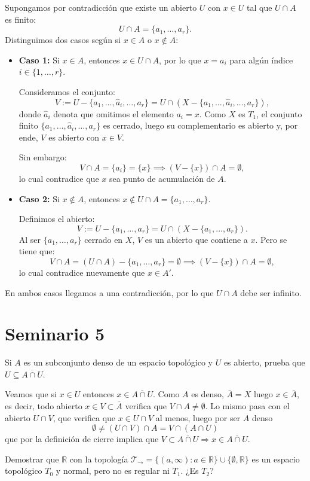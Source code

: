 \begin{sol}
Supongamos por contradicción que existe un abierto $U$ con $x \in U$ tal que $U \cap A$ es finito:
\[
    U \cap A = \{a_1, \ldots, a_r\}.
\]
Distinguimos dos casos según si $x \in A$ o $x \notin A$:
\begin{itemize}
    \item \textbf{Caso 1:} Si $x \in A$, entonces $x \in U \cap A$, por lo que $x = a_i$ para algún índice $i \in \{1, \ldots, r\}$.
    
    Consideramos el conjunto:
    \[
        V := U - \{a_1, \ldots, \hat{a}_i, \ldots, a_r\} = U \cap \left(X - \{a_1, \ldots, \hat{a}_i, \ldots, a_r\}\right),
    \]
    donde $\hat{a}_i$ denota que omitimos el elemento $a_i = x$. Como $X$ es $T_1$, el conjunto finito $\{a_1, \ldots, \hat{a}_i, \ldots, a_r\}$ es cerrado, luego su complementario es abierto y, por ende, $V$ es abierto con $x \in V$.
    
    Sin embargo:
    \[
        V \cap A = \{a_i\} = \{x\} \implies (V - \{x\}) \cap A = \emptyset,
    \]
    lo cual contradice que $x$ sea punto de acumulación de $A$.

    \item \textbf{Caso 2:} Si $x \notin A$, entonces $x \notin U \cap A = \{a_1, \ldots, a_r\}$.
    
    Definimos el abierto:
    \[
        V := U - \{a_1, \ldots, a_r\} = U \cap \left(X - \{a_1, \ldots, a_r\}\right).
    \]
    Al ser $\{a_1, \ldots, a_r\}$ cerrado en $X$, $V$ es un abierto que contiene a $x$. Pero se tiene que:
    \[
        V \cap A = (U \cap A) - \{a_1, \ldots, a_r\} = \emptyset \implies (V - \{x\}) \cap A = \emptyset,
    \]
    lo cual contradice nuevamente que $x \in A'$.
\end{itemize}
En ambos casos llegamos a una contradicción, por lo que $U \cap A$ debe ser infinito.
\end{sol}
\section{Seminario 5} %
\begin{ejer}
    [57] Si $A$ es un subconjunto denso de un espacio topológico y $U$ es abierto, prueba que $U \subseteq \overline{A \cap U}$.
\end{ejer}
\begin{sol}
    Veamos que si $x \in U$ entonces $x\in \overline{A \cap U}$. Como $A$ es denso, $\overline{A}=X$ luego $x \in \overline{A}$, es decir, todo abierto $x \in V \subset \overline{A}$ verifica que $V \cap A \neq \emptyset$. Lo mismo pasa con el abierto $U\cap V$, que verifica que $x\in U \cap V$ al menos, luego por ser $A$ denso
    $$\emptyset \neq (U \cap V) \cap A = V \cap (A \cap U) $$
    que por la definici\'on de cierre implica que $V \subset \overline{A \cap U} \Rightarrow x \in \overline{A \cap U}$. 
\end{sol}\begin{ejer}
    [84] Demostrar que $\mathbb{R}$ con la topología $\mathcal{T}_{\rightarrow} = \{(a, \infty) : a \in \mathbb{R}\} \cup \{\emptyset, \mathbb{R}\}$ es un espacio topológico $T_0$ y normal, pero no es regular ni $T_1$. ¿Es $T_2$?
\end{ejer}

